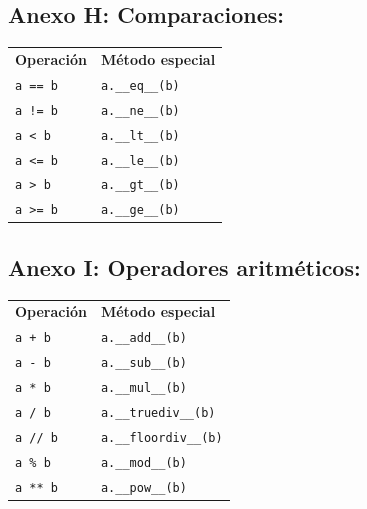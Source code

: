 \documentclass[11pt,a5paper,twoside]{book}
\begin{document}
\newpage
\subsection{Anexo H: Comparaciones:}

\begin{tcolorbox}
\begin{tabular}{ll}
 \textbf{Operación}  &  \textbf{Método especial}  \\
 {\scriptsize \texttt{a == b}}   &  {\scriptsize \texttt{a.\_\_eq\_\_(b)}}    \\
 {\scriptsize \texttt{a != b}}   &  {\scriptsize \texttt{a.\_\_ne\_\_(b)}}    \\
 {\scriptsize \texttt{a \textless{} b}}    &  {\scriptsize \texttt{a.\_\_lt\_\_(b)}}    \\
 {\scriptsize \texttt{a \textless{}= b}}   &  {\scriptsize \texttt{a.\_\_le\_\_(b)}}    \\
 {\scriptsize \texttt{a \textgreater{} b}}    &  {\scriptsize \texttt{a.\_\_gt\_\_(b)}}    \\
 {\scriptsize \texttt{a \textgreater{}= b}}   &  {\scriptsize \texttt{a.\_\_ge\_\_(b)}}    \\
\end{tabular}
\end{tcolorbox}
\subsection{Anexo I: Operadores aritméticos:}

\begin{tcolorbox}
\begin{tabular}{ll}
 \textbf{Operación}  &  \textbf{Método especial}      \\
 {\scriptsize \texttt{a + b}}    &  {\scriptsize \texttt{a.\_\_add\_\_(b)}}       \\
 {\scriptsize \texttt{a - b}}    &  {\scriptsize \texttt{a.\_\_sub\_\_(b)}}       \\
 {\scriptsize \texttt{a * b}}    &  {\scriptsize \texttt{a.\_\_mul\_\_(b)}}       \\
 {\scriptsize \texttt{a / b}}    &  {\scriptsize \texttt{a.\_\_truediv\_\_(b)}}   \\
 {\scriptsize \texttt{a // b}}   &  {\scriptsize \texttt{a.\_\_floordiv\_\_(b)}}  \\
 {\scriptsize \texttt{a \% b}}    &  {\scriptsize \texttt{a.\_\_mod\_\_(b)}}       \\
 {\scriptsize \texttt{a ** b}}   &  {\scriptsize \texttt{a.\_\_pow\_\_(b)}}       \\
\end{tabular}
\end{tcolorbox}
\end{document}
